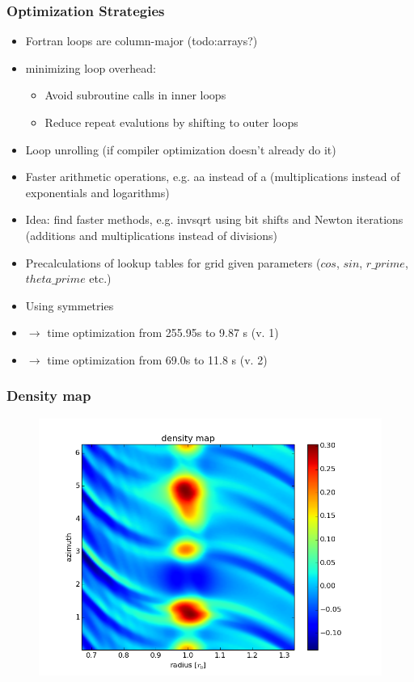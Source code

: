 \documentclass{beamer}
\begin{document}
\begin{frame}
 \frametitle{Optimization Strategies}
 \begin{itemize}
  \item Fortran loops are column-major (todo:arrays?)
  \item minimizing loop overhead:
  \begin{itemize}
   \item Avoid subroutine calls in inner loops
   \item Reduce repeat evalutions by shifting to outer loops
  \end{itemize}
  \item Loop unrolling (if compiler optimization doesn't already do it)
  \item Faster arithmetic operations, e.g. a\textasteriskcentered a instead of a\textasteriskcentered{} (multiplications instead of exponentials and logarithms)
  \item Idea: find faster methods, e.g. invsqrt using bit shifts and Newton iterations (additions and multiplications instead of divisions)
  \item Precalculations of lookup tables for grid given parameters ($cos$, $sin$, $r\_prime$, $theta\_prime$ etc.)
  \item Using symmetries
 
 \item[] $\longrightarrow$ time optimization from 255.95s to 9.87 s (v. 1)
 \item[] $\longrightarrow$ time optimization from 69.0s to 11.8 s (v. 2)
\end{itemize}
\end{frame}
\begin{frame}
 \frametitle{Density map}
 \begin{figure}[H]
  \centering
  \includegraphics[width=.8\textwidth]{density.png}
 \end{figure} 
\end{frame}
\end{document}

